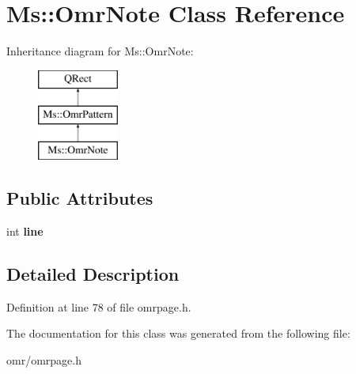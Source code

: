 \hypertarget{class_ms_1_1_omr_note}{}\section{Ms\+:\+:Omr\+Note Class Reference}
\label{class_ms_1_1_omr_note}
Inheritance diagram for Ms\+:\+:Omr\+Note\+:\begin{figure}[H]
\begin{center}
\leavevmode
\includegraphics[height=3.000000cm]{class_ms_1_1_omr_note}
\end{center}
\end{figure}
\subsection*{Public Attributes}
\begin{DoxyCompactItemize}
\item 
\mbox{\label{class_ms_1_1_omr_note_a45dcad4765edebd06b305ce4198a7e2f}} 
int {\bfseries line}
\end{DoxyCompactItemize}


\subsection{Detailed Description}


Definition at line 78 of file omrpage.\+h.



The documentation for this class was generated from the following file\+:\begin{DoxyCompactItemize}
\item 
omr/omrpage.\+h\end{DoxyCompactItemize}
